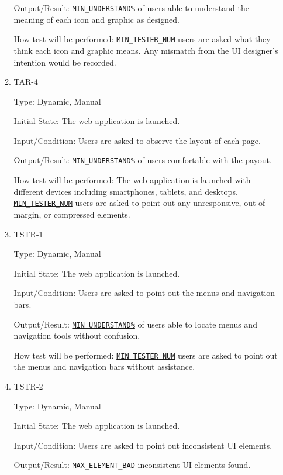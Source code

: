 \documentclass[12pt, titlepage]{article}
\begin{document}
\begin{enumerate}
\begin{enumerate}
Output/Result: \hyperref[MIN_UNDERSTAND]{\texttt{MIN\_UNDERSTAND\%}} of users able to understand the meaning of each icon and graphic as designed.
					
How test will be performed: \hyperref[MIN_TESTER_NUM]{\texttt{MIN\_TESTER\_NUM}} users are asked what they think each icon and graphic means. Any mismatch from the UI designer's intention would be recorded.

\item{TAR-4\\}\label{TAR-4}

Type: Dynamic, Manual
					
Initial State: The web application is launched.
					
Input/Condition: Users are asked to observe the layout of each page.
					
Output/Result: \hyperref[MIN_UNDERSTAND]{\texttt{MIN\_UNDERSTAND\%}} of users comfortable with the payout.
					
How test will be performed: The web application is launched with different devices including smartphones, tablets, and desktops.  \hyperref[MIN_TESTER_NUM]{\texttt{MIN\_TESTER\_NUM}} users are asked to point out any unresponsive, out-of-margin, or compressed elements.

\item{TSTR-1\\}\label{TSTR-1}

Type: Dynamic, Manual
					
Initial State: The web application is launched.
					
Input/Condition: Users are asked to point out the menus and navigation bars.
					
Output/Result: \hyperref[MIN_UNDERSTAND]{\texttt{MIN\_UNDERSTAND\%}} of users able to locate menus and navigation tools without confusion.
					
How test will be performed: \hyperref[MIN_TESTER_NUM]{\texttt{MIN\_TESTER\_NUM}} users are asked to point out the menus and navigation bars without assistance.

\item{TSTR-2\\}\label{TSTR-2}

Type: Dynamic, Manual
					
Initial State: The web application is launched.
					
Input/Condition: Users are asked to point out inconsistent UI elements.
					
Output/Result: \hyperref[MAX_ELEMENT_BAD]{\texttt{MAX\_ELEMENT\_BAD}} inconsistent UI elements found.
					

\end{enumerate}
\end{enumerate}
\end{document}
